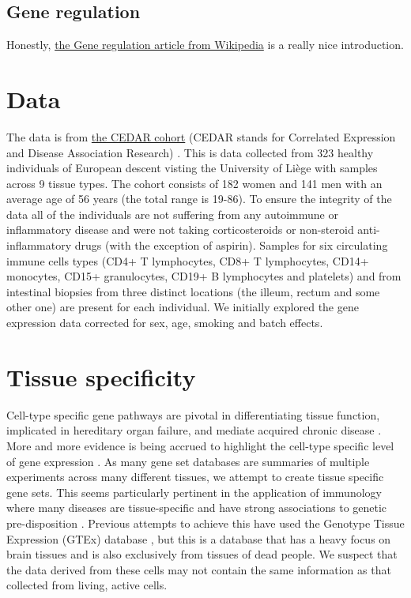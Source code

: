 \documentclass[a4paper,10pt]{article}
\begin{document}
\subsection{Gene regulation}
Honestly, \href{https://www.wikiwand.com/en/Regulation_of_gene_expression#/Examples_of_gene_regulation}
{the Gene regulation article from Wikipedia} is a really nice introduction.

\section{Data}
The data is from \href{http://139.165.108.18/srv/genmol/permanent/1be6993fe41c12a051c9244d67c91da2be49e5dd26a6cd79f442bc006971e2ef/crohn-index.html}
{the CEDAR cohort} (CEDAR stands for Correlated Expression and Disease Association Research) \cite{the_international_ibd_genetics_consortium_ibd_2018}. This is 
data collected from 323 healthy individuals of European descent visting the University of Li\`ege with 
samples across 9 tissue types. The cohort consists of 182 women and 141 men with an average age of 56 
years (the total range is 19-86). To ensure the integrity of the data all of the individuals are not 
suffering from any autoimmune or inflammatory disease and were not taking corticosteroids or non-steroid 
anti-inflammatory drugs (with the exception of aspirin). Samples for six circulating immune cells types
(CD4+ T lymphocytes, CD8+ T lymphocytes, CD14+ monocytes, CD15+ granulocytes, CD19+ B lymphocytes and 
platelets) and from intestinal biopsies from three distinct locations (the illeum, rectum and 
some other one) are present for each individual. We initially explored the gene expression data 
corrected for sex, age, smoking and batch effects.

\section{Tissue specificity}
Cell-type specific gene pathways are pivotal in differentiating tissue function, implicated in hereditary organ failure, and mediate acquired chronic disease \cite{ju_defining_2013}. More and more evidence is being accrued to highlight the cell-type specific level of gene expression \cite{grundberg_mapping_2012}\cite{ong_enhancer_2011}\cite{maniatis_regulation_1987}. As many gene set databases are summaries of multiple experiments across many different tissues, we attempt to create tissue specific gene sets. This seems particularly pertinent in the application of immunology where many diseases are tissue-specific and have strong associations to genetic pre-disposition \cite{vyse_genetic_1996}\cite{maas_cutting_2002}\cite{aune_co-localization_2004}\cite{botstein_discovering_2003}. Previous attempts to achieve this have used the Genotype Tissue Expression (GTEx) database \cite{gtex_consortium_genetic_2017}, but this is a database that has a heavy focus on brain tissues and is also exclusively from tissues of dead people. We suspect that the data derived from these cells may not contain the same information as that collected from living, active cells. 


%

\end{document}
